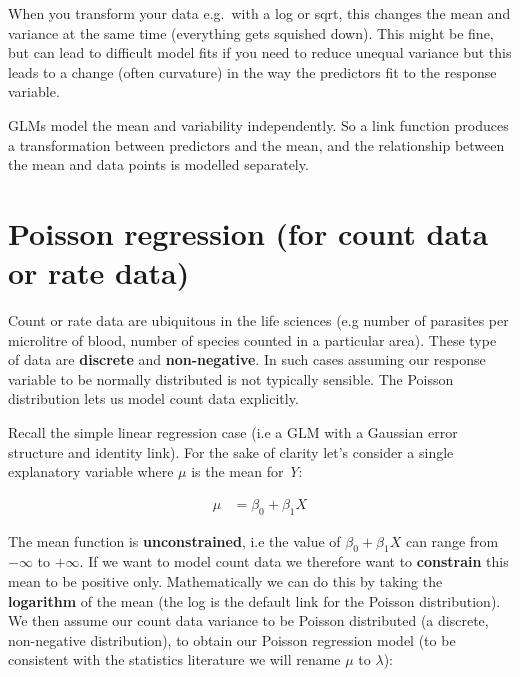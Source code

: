 \documentclass[
]{book}
\makeatletter
\newenvironment{kframe}{%
\medskip{}
\setlength{\fboxsep}{.8em}
 \def\at@end@of@kframe{}%
 \ifinner\ifhmode%
  \def\at@end@of@kframe{\end{minipage}}%
  \begin{minipage}{\columnwidth}%
 \fi\fi%
 \def\FrameCommand##1{\hskip\@totalleftmargin \hskip-\fboxsep
 \colorbox{shadecolor}{##1}\hskip-\fboxsep
     \hskip-\linewidth \hskip-\@totalleftmargin \hskip\columnwidth}%
 \MakeFramed {\advance\hsize-\width
   \@totalleftmargin\z@ \linewidth\hsize
   \@setminipage}}%
 {\par\unskip\endMakeFramed%
 \at@end@of@kframe}
\newenvironment{block}[1]
  {
  \begin{itemize}
  \renewcommand{\labelitemi}{
    \raisebox{-.7\height}[0pt][0pt]{
      {\setkeys{Gin}{width=3em,keepaspectratio}\texttt{[image: images/\#1]}}
    }
  }
  \setlength{\fboxsep}{1em}
  \begin{kframe}
  \item
  }
  {
  \end{kframe}
  \end{itemize}
  }
\newenvironment{rmdnote}
  {\begin{block}{note}}
  {\end{block}}
\makeatother
\begin{document}
\begin{rmdnote}
When you transform your data e.g.~with a log or sqrt, this changes the
mean and variance at the same time (everything gets squished down). This
might be fine, but can lead to difficult model fits if you need to
reduce unequal variance but this leads to a change (often curvature) in
the way the predictors fit to the response variable.

GLMs model the mean and variability independently. So a link function
produces a transformation between predictors and the mean, and the
relationship between the mean and data points is modelled separately.
\end{rmdnote}

\hypertarget{poisson-regression-for-count-data-or-rate-data}{%
\section{Poisson regression (for count data or rate data)}\label{poisson-regression-for-count-data-or-rate-data}}

Count or rate data are ubiquitous in the life sciences (e.g number of parasites per microlitre of blood, number of species counted in a particular area). These type of data are \textbf{discrete} and \textbf{non-negative}.
In such cases assuming our response variable to be normally distributed is not typically sensible.
The Poisson distribution lets us model count data explicitly.

Recall the simple linear regression case (i.e a GLM with a Gaussian error structure and identity link). For the sake of clarity let's consider a single explanatory variable where \(\mu\) is the mean for \emph{Y}:

\[
\begin{aligned}
\mu & = \beta_0 + \beta_1X
\end{aligned}
\]

The mean function is \textbf{unconstrained}, i.e the value of \(\beta_0 + \beta_1X\) can range from \(-\infty\) to \(+\infty\). If we want to model count data we therefore want to \textbf{constrain} this mean to be positive only. Mathematically we can do this by taking the \textbf{logarithm} of the mean (the log is the default link for the Poisson distribution). We then assume our count data variance to be Poisson distributed (a discrete, non-negative distribution), to obtain our Poisson regression model (to be consistent with the statistics literature we will rename \(\mu\) to \(\lambda\)):
\end{document}
